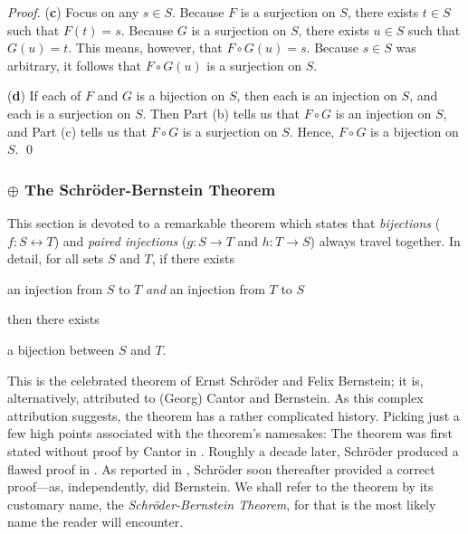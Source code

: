 \begin{proof}
\medskip

\noindent ({\bf c})
Focus on any $s \in S$.  Because $F$ is a surjection on $S$, there exists $t \in S$ such that $F(t) = s$.  Because $G$ is a surjection on $S$, there exists $u \in S$ such that $G(u) = t$.  This means, however, that $F \circ G(u) = s$.  Because $s \in S$ was arbitrary, it follows that $F \circ G(u)$ is a surjection on $S$.

\medskip

\noindent ({\bf d})
If each of $F$ and $G$ is a bijection on $S$, then each is an injection on $S$, and each is a surjection on $S$.  Then Part (b) tells us that $F \circ G$ is an injection on $S$, and Part (c) tells
us that $F \circ G$ is a surjection on $S$.  Hence, $F \circ G$ is a bijection on $S$.  \qed
\end{proof}


\subsubsection{$\oplus$ The Schr\"{o}der-Bernstein Theorem}
\label{sec:schroeder-bernstein}

This section is devoted to a remarkable theorem which states that {\em bijections} ($f: S \leftrightarrow T$) and {\em paired injections} ($g: S \rightarrow T$ and $h: T \rightarrow S$) always travel together.  In detail, for all sets $S$ and $T$, if there exists

\smallskip

\hspace*{.2in}{\em both} an injection from $S$ to $T$ {\em and} an injection from $T$ to $S$

\smallskip

\noindent then there exists

\smallskip

\hspace*{.2in}a bijection between $S$ and $T$.

\medskip


\noindent
This is the celebrated theorem of Ernst Schr\"{o}der and Felix Bernstein; it is, alternatively, attributed to (Georg) Cantor and Bernstein.  As this complex attribution suggests, the theorem has a rather complicated history.  Picking just a few high points associated with the theorem's namesakes: The theorem was first stated without proof by Cantor in \cite{Cantor87}.  Roughly a decade later, Schr\"{o}der produced a flawed proof in \cite{Schroeder98a}.  As reported in \cite{Deiser2010}, Schr\"{o}der soon thereafter provided a correct proof---as, independently, did Bernstein.  We shall refer to the theorem by its customary name, the {\it Schr\"{o}der-Bernstein Theorem}, for that is the most likely name the reader will encounter. 

